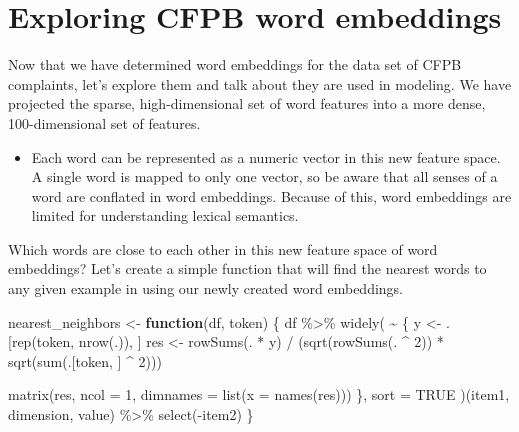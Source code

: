 \documentclass[
]{krantz}
\makeatletter
\newenvironment{Shaded}{\begin{snugshade}}{\end{snugshade}}
\newcommand{\AttributeTok}[1]{\textcolor[rgb]{0.77,0.63,0.00}{#1}}
\newcommand{\ConstantTok}[1]{\textcolor[rgb]{0.00,0.00,0.00}{#1}}
\newcommand{\ControlFlowTok}[1]{\textcolor[rgb]{0.13,0.29,0.53}{\textbf{#1}}}
\newcommand{\DecValTok}[1]{\textcolor[rgb]{0.00,0.00,0.81}{#1}}
\newcommand{\FunctionTok}[1]{\textcolor[rgb]{0.00,0.00,0.00}{#1}}
\newcommand{\NormalTok}[1]{#1}
\newcommand{\OtherTok}[1]{\textcolor[rgb]{0.56,0.35,0.01}{#1}}
\newcommand{\SpecialCharTok}[1]{\textcolor[rgb]{0.00,0.00,0.00}{#1}}
\newenvironment{kframe}{%
\medskip{}
\setlength{\fboxsep}{.8em}
 \def\at@end@of@kframe{}%
 \ifinner\ifhmode%
  \def\at@end@of@kframe{\end{minipage}}%
  \begin{minipage}{\columnwidth}%
 \fi\fi%
 \def\FrameCommand##1{\hskip\@totalleftmargin \hskip-\fboxsep
 \colorbox{shadecolor}{##1}\hskip-\fboxsep
     \hskip-\linewidth \hskip-\@totalleftmargin \hskip\columnwidth}%
 \MakeFramed {\advance\hsize-\width
   \@totalleftmargin\z@ \linewidth\hsize
   \@setminipage}}%
 {\par\unskip\endMakeFramed%
 \at@end@of@kframe}
\renewenvironment{Shaded}{\begin{kframe}}{\end{kframe}}
\newenvironment{rmdblock}[1]
  {\begin{shaded*}
  \begin{itemize}[left = -1cm, labelsep = 1cm]
  \renewcommand{\labelitemi}{
    \raisebox{-.7\height}[0pt][0pt]{
      {\setkeys{Gin}{width=3em,keepaspectratio}\texttt{[image: images/\#1]}}
    }
  }
 
  \item
  }
  {
  \end{itemize}
  \end{shaded*}
  }
\newenvironment{rmdwarn}
  {\begin{rmdblock}{warning}}
  {\end{rmdblock}}
\makeatother
\begin{document}
\hypertarget{exploring-cfpb-word-embeddings}{%
\section{Exploring CFPB word embeddings}\label{exploring-cfpb-word-embeddings}}

Now that we have determined word embeddings for the data set of CFPB complaints, let's explore them and talk about they are used in modeling. We have projected the sparse, high-dimensional set of word features into a more dense, 100-dimensional set of features.

\begin{rmdwarn}
Each word can be represented as a numeric vector in this new feature
space. A single word is mapped to only one vector, so be aware that all
senses of a word are conflated in word embeddings. Because of this, word
embeddings are limited for understanding lexical semantics.
\end{rmdwarn}

Which words are close to each other in this new feature space of word embeddings? Let's create a simple function that will find the nearest words to any given example in using our newly created word embeddings.

\begin{Shaded}
\begin{Highlighting}[]
\NormalTok{nearest\_neighbors }\OtherTok{\textless{}{-}} \ControlFlowTok{function}\NormalTok{(df, token) \{}
\NormalTok{  df }\SpecialCharTok{\%\textgreater{}\%}
    \FunctionTok{widely}\NormalTok{(}
      \SpecialCharTok{\textasciitilde{}}\NormalTok{ \{}
\NormalTok{        y }\OtherTok{\textless{}{-}}\NormalTok{ .[}\FunctionTok{rep}\NormalTok{(token, }\FunctionTok{nrow}\NormalTok{(.)), ]}
\NormalTok{        res }\OtherTok{\textless{}{-}} \FunctionTok{rowSums}\NormalTok{(. }\SpecialCharTok{*}\NormalTok{ y) }\SpecialCharTok{/} 
\NormalTok{          (}\FunctionTok{sqrt}\NormalTok{(}\FunctionTok{rowSums}\NormalTok{(. }\SpecialCharTok{\^{}} \DecValTok{2}\NormalTok{)) }\SpecialCharTok{*} \FunctionTok{sqrt}\NormalTok{(}\FunctionTok{sum}\NormalTok{(.[token, ] }\SpecialCharTok{\^{}} \DecValTok{2}\NormalTok{)))}

        \FunctionTok{matrix}\NormalTok{(res, }\AttributeTok{ncol =} \DecValTok{1}\NormalTok{, }\AttributeTok{dimnames =} \FunctionTok{list}\NormalTok{(}\AttributeTok{x =} \FunctionTok{names}\NormalTok{(res)))}
\NormalTok{        \},}
      \AttributeTok{sort =} \ConstantTok{TRUE}
\NormalTok{    )(item1, dimension, value) }\SpecialCharTok{\%\textgreater{}\%}
    \FunctionTok{select}\NormalTok{(}\SpecialCharTok{{-}}\NormalTok{item2)}
\NormalTok{\}}
\end{Highlighting}
\end{Shaded}
\end{document}
